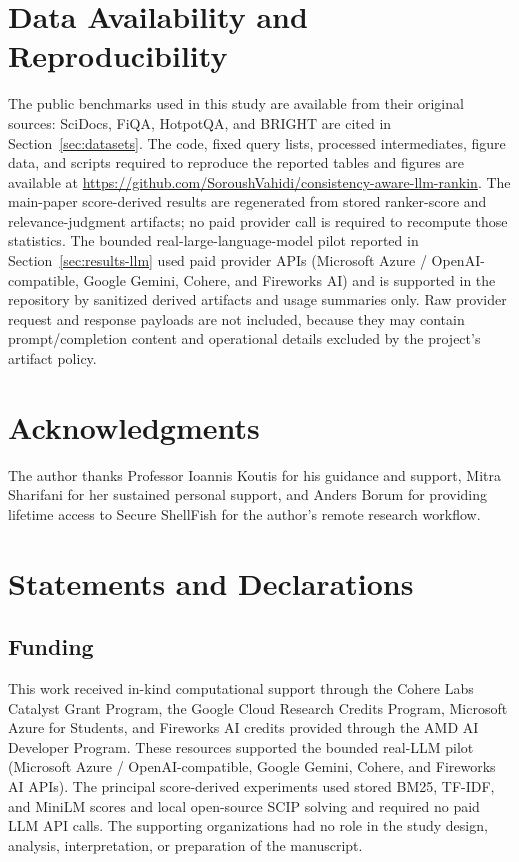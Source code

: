 \documentclass[pdflatex,sn-basic,Numbered]{sn-jnl}
\begin{document}
\section{Data Availability and Reproducibility}
\label{sec:data-availability}

The public benchmarks used in this study are available from their original
sources: SciDocs, FiQA, HotpotQA, and BRIGHT are cited in
Section~\ref{sec:datasets}. The code, fixed query lists, processed
intermediates, figure data, and scripts required to reproduce the reported
tables and figures are available at
\url{https://github.com/SoroushVahidi/consistency-aware-llm-rankin}. The
main-paper score-derived results are regenerated from stored ranker-score
and relevance-judgment artifacts; no paid provider call is required to
recompute those statistics. The bounded real-large-language-model pilot
reported in Section~\ref{sec:results-llm} used paid provider APIs
(Microsoft Azure / OpenAI-compatible, Google Gemini, Cohere, and Fireworks
AI) and is supported in the repository by sanitized derived artifacts and
usage summaries only. Raw provider request and response payloads are not
included, because they may contain prompt/completion content and
operational details excluded by the project's artifact policy.

\section*{Acknowledgments}

The author thanks Professor Ioannis Koutis for his guidance and support,
Mitra Sharifani for her sustained personal support, and Anders Borum for
providing lifetime access to Secure ShellFish for the author's remote
research workflow.

\backmatter

\section*{Statements and Declarations}

\subsection*{Funding}
This work received in-kind computational support through the Cohere Labs
Catalyst Grant Program, the Google Cloud Research Credits Program,
Microsoft Azure for Students, and Fireworks AI credits provided through
the AMD AI Developer Program. These resources supported the bounded
real-LLM pilot (Microsoft Azure / OpenAI-compatible, Google Gemini,
Cohere, and Fireworks AI APIs). The principal score-derived experiments
used stored BM25, TF-IDF, and MiniLM scores and local open-source SCIP
solving and required no paid LLM API calls. The supporting organizations
had no role in the study design, analysis, interpretation, or preparation
of the manuscript.
\end{document}
